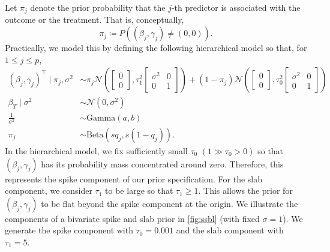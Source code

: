 \documentclass[preprint,12pt]{elsarticle}
\newcommand{\normal}{\mathcal{N}}
\begin{document}
Let $\pi_j$ denote the prior probability that the $j$-th
predictor is associated with the outcome or the 
treatment. That is, conceptually,
\begin{equation}
	\pi_j \coloneqq P\left((\beta_j,\gamma_j)\not=(0,0)\right).
\end{equation}
Practically, we model this by defining the following hierarchical model
so that,
for $1\le j\le p$,
\begin{align}
	\label{eq:spike:slab:prior:beta:gamma}(\beta_j,\gamma_j)^{\top} \mid \pi_{j}, \sigma^2 &\sim 
	\pi_{j}\normal\left( \begin{bmatrix}
		0 \\
		0
	\end{bmatrix}, 
	\tau_1^2\begin{bmatrix}
		\sigma^2 & 0 \\
		0 & 1
	\end{bmatrix}\right)
	+ (1-\pi_{j}) \normal\left(\begin{bmatrix}
		0 \\
		0
	\end{bmatrix}, 
	\tau_0^2\begin{bmatrix}
		\sigma^2 & 0 \\
		0 & 1
	\end{bmatrix}\right)\\
	\beta_T\mid \sigma^2 &\sim \normal\left(0, \sigma^2\right)\label{eq:prior:causal}\\
        \frac{1}{\sigma^2}&\sim \text{Gamma}(a, b)\\
	\pi_{j} &\sim\text{Beta}\left(sq_j, s(1-q_j)\right).
\end{align}
In the hierarchical model, we fix sufficiently small $\tau_0$
$(1\gg\tau_0>0)$ so that  $(\beta_j, \gamma_j)$ has its probability mass 
concentrated around zero. Therefore, this represents the spike component of our prior specification. 
For the slab component, we consider $\tau_1$ to be large so that $\tau_1\ge 1$. This allows the prior for $(\beta_j,\gamma_j)$ to be flat beyond the spike component at the origin. 
We illustrate the components of a bivariate spike and slab prior in 
\cref{fig:ssbl} (with fixed $\sigma=1$). We generate the spike component 
with $\tau_0=0.001$ and the slab component with $\tau_1=5$.
\end{document}
